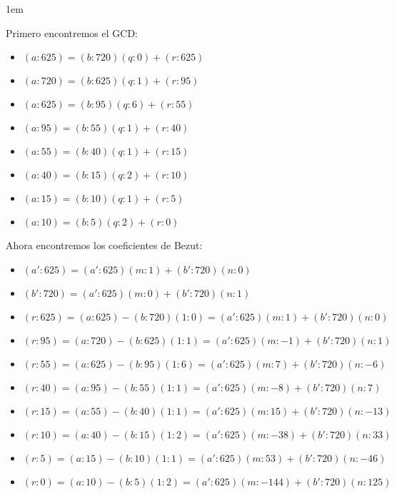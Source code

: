 \documentclass[12pt, fleqn]{article}                             %
\newenvironment{SmallIndentation}[1][0.75em]                    %
    {\begin{adjustwidth}{#1}{}\begin{footnotesize}}                 %
    {\end{footnotesize}\end{adjustwidth}}                           %
\begin{document}
\begin{itemize}
\begin{SmallIndentation}[1em]
                Primero encontremos el GCD:
                \begin{itemize}
                \item $(a:625) = (b:720)(q:0) + (r:625)$  
                    \item $(a:720) = (b:625)(q:1) + (r:95) $
                    \item $(a:625) = (b:95)(q:6) + (r:55)  $  
                    \item $(a:95) = (b:55)(q:1) + (r:40)   $ 
                    \item $(a:55) = (b:40)(q:1) + (r:15)   $  
                    \item $(a:40) = (b:15)(q:2) + (r:10)   $  
                    \item $(a:15) = (b:10)(q:1) + (r:5)    $ 
                    \item $(a:10) = (b:5)(q:2) + (r:0)     $
                \end{itemize}

                Ahora encontremos los coeficientes de Bezut:
                \begin{itemize}
                    \item $(a':625) = (a':625)(m:1) + (b':720)(n:0)$
                    \item $(b':720) = (a':625)(m:0) + (b':720)(n:1)$
                \end{itemize}

                \begin{itemize}
                    \item $(r:625) = (a:625) - (b:720)(1:0)  =  (a':625)(m:1) + (b':720)(n:0)$   
                    \item $(r:95) = (a:720) - (b:625)(1:1)  =  (a':625)(m:-1) + (b':720)(n:1)$   
                    \item $(r:55) = (a:625) - (b:95)(1:6)  =  (a':625)(m:7) + (b':720)(n:-6) $   
                    \item $(r:40) = (a:95) - (b:55)(1:1)  =  (a':625)(m:-8) + (b':720)(n:7)  $   
                    \item $(r:15) = (a:55) - (b:40)(1:1)  =  (a':625)(m:15) + (b':720)(n:-13)$   
                    \item $(r:10) = (a:40) - (b:15)(1:2)  =  (a':625)(m:-38) + (b':720)(n:33)$   
                    \item $(r:5) = (a:15) - (b:10)(1:1)  =  (a':625)(m:53) + (b':720)(n:-46) $  
                    \item $(r:0) = (a:10) - (b:5)(1:2)  =  (a':625)(m:-144) + (b':720)(n:125)$  
                \end{itemize}
    



\end{SmallIndentation}
\end{itemize}
\end{document}
